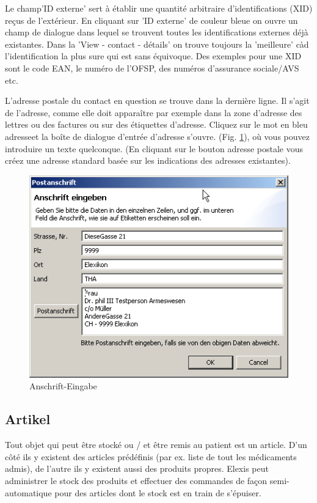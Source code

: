 \medskip

 Le champ'ID externe' sert à établir une quantité arbitraire d'identifications (XID) reçus de l'extérieur. En cliquant sur 'ID externe' de couleur bleue on ouvre un champ de dialogue dans lequel se trouvent toutes les identifications externes déjà existantes. Dans la 'View - contact - détails' on trouve toujours la 'meilleure' càd l'identification la plus sure qui est sans équivoque. Des exemples pour une XID sont le code EAN, le numéro de l'OFSP, des numéros d'assurance sociale/AVS etc.

\medskip

L'adresse postale du contact en question se trouve dans la dernière ligne. Il s'agit de l'adresse, comme elle doit apparaître par exemple dans la zone d'adresse des lettres ou des factures ou sur des étiquettes d'adresse. Cliquez sur le mot en bleu \glqq adresse\grqq{}et la boîte de dialogue d'entrée d'adresse s'ouvre. (Fig.
\ref{fig:anschrift}), où vous pouvez introduire un texte quelconque.  (En cliquant sur le bouton \glqq adresse postale \grqq{} vous créez une adresse standard basée sur les indications des adresses existantes).



\begin{figure}[htp]
\begin{center}
  \includegraphics{images/anschrifteingabe}
  \caption{Anschrift-Eingabe}
  \label{fig:anschrift}
\end{center}
\end{figure}
\bigskip
\pagebreak[3]
\subsection{Artikel}
\label{view:artikel}
Tout objet qui peut être stocké ou / et être remis au patient est un \glqq article\grqq{}. D'un côté ils y existent des articles prédéfinis (par ex. liste de tout les médicaments admis), de l'autre ils y existent aussi des produits propres. Elexis peut administrer le stock des produits et effectuer des commandes de façon semi-automatique pour des articles dont le stock est en train de s'épuiser.


